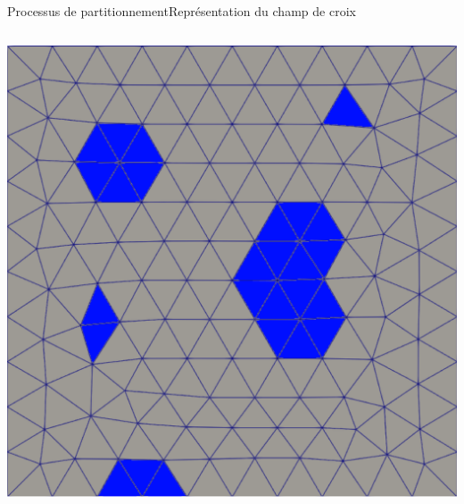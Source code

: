 \documentclass[compress,10pt,aspectratio=169]{beamer}
\begin{document}
\begin{frame}{Processus de partitionnement}{Représentation du champ de croix}
\begin{columns}
\begin{column}{0.2\textwidth}
{    \includegraphics[scale=0.11]{images/zone_singuliere_2.pdf} \vspace{0.2cm}}
    \end{column}
\end{columns}
\end{frame}
\end{document}
